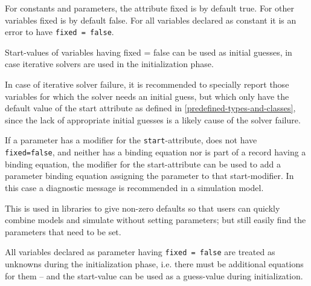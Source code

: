 For constants and parameters, the attribute fixed is by default true.
For other variables fixed is by default false. For all variables
declared as constant it is an error to have \lstinline!fixed = false!.

Start-values of variables having fixed = false can be used as initial
guesses, in case iterative solvers are used in the initialization phase.

\begin{nonnormative}
In case of iterative solver failure, it is recommended to specially report those variables for which the solver needs an initial guess, but which only have the default
value of the start attribute as defined in \autoref{predefined-types-and-classes}, since the lack of appropriate initial guesses is a likely cause of the solver failure.
\end{nonnormative}

If a parameter has a modifier for the \lstinline!start!-attribute, does not have
\lstinline!fixed=false!, and neither has a binding equation nor is part of a record
having a binding equation, the modifier for the start-attribute can be
used to add a parameter binding equation assigning the parameter to that
start-modifier. In this case a diagnostic message is recommended in a
simulation model.

\begin{nonnormative}
This is used in libraries to give non-zero defaults so that users can quickly combine models and simulate without setting parameters; but still easily find the parameters
that need to be set.
\end{nonnormative}

All variables declared as parameter having \lstinline!fixed = false! are treated as
unknowns during the initialization phase, i.e. there must be additional
equations for them -- and the start-value can be used as a guess-value
during initialization.


